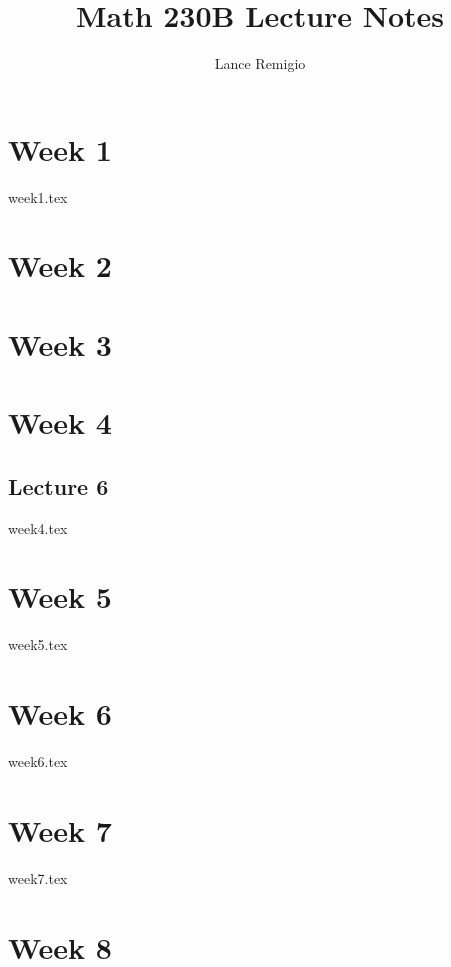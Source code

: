\documentclass[a4paper]{book}
\title{Math 230B Lecture Notes}
\author{Lance Remigio}
\begin{document}
\maketitle

\chapter{Week 1}

{week1.tex}

\chapter{Week 2}


\chapter{Week 3}



\chapter{Week 4}

\section{Lecture 6}

{week4.tex}

\chapter{Week 5}

{week5.tex}

\chapter{Week 6}

{week6.tex}

\chapter{Week 7}

{week7.tex}

\chapter{Week 8}
\end{document}
